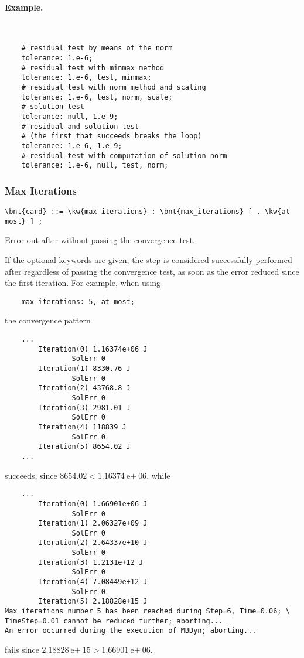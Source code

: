 \noindent
\paragraph{Example.} \
\begin{verbatim}
    # residual test by means of the norm
    tolerance: 1.e-6;
    # residual test with minmax method
    tolerance: 1.e-6, test, minmax;
    # residual test with norm method and scaling
    tolerance: 1.e-6, test, norm, scale;
    # solution test
    tolerance: null, 1.e-9;
    # residual and solution test
    # (the first that succeeds breaks the loop)
    tolerance: 1.e-6, 1.e-9;
    # residual test with computation of solution norm
    tolerance: 1.e-6, null, test, norm;
\end{verbatim}

\subsubsection{Max Iterations}
\begin{Verbatim}[commandchars=\\\{\}]
    \bnt{card} ::= \kw{max iterations} : \bnt{max_iterations} [ , \kw{at most} ] ;
\end{Verbatim}
Error out after  without passing the convergence test.

If the optional keywords  are given,
the step is considered successfully performed after 
regardless of passing the convergence test, as soon as the error
reduced since the first iteration.
For example, when using
\begin{verbatim}
    max iterations: 5, at most;
\end{verbatim}
the convergence pattern
\begin{verbatim}
    ...
        Iteration(0) 1.16374e+06 J
                SolErr 0
        Iteration(1) 8330.76 J
                SolErr 0
        Iteration(2) 43768.8 J
                SolErr 0
        Iteration(3) 2981.01 J
                SolErr 0
        Iteration(4) 118839 J
                SolErr 0
        Iteration(5) 8654.02 J
    ...
\end{verbatim}
succeeds, since $8654.02 < 1.16374\text{e$+$}06$, while
\begin{verbatim}
    ...
        Iteration(0) 1.66901e+06 J
                SolErr 0
        Iteration(1) 2.06327e+09 J
                SolErr 0
        Iteration(2) 2.64337e+10 J
                SolErr 0
        Iteration(3) 1.2131e+12 J
                SolErr 0
        Iteration(4) 7.08449e+12 J
                SolErr 0
        Iteration(5) 2.18828e+15 J
Max iterations number 5 has been reached during Step=6, Time=0.06; \
TimeStep=0.01 cannot be reduced further; aborting...
An error occurred during the execution of MBDyn; aborting... 
\end{verbatim}
fails since $2.18828\text{e$+$}15 > 1.66901\text{e$+$}06$.

